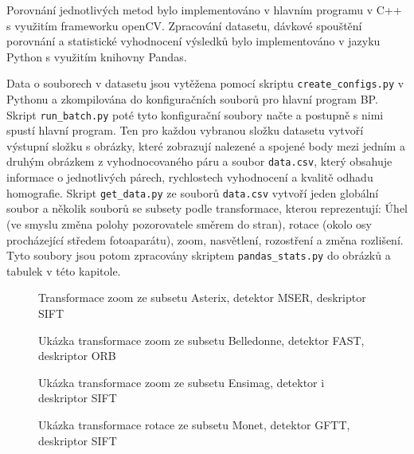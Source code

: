 
Porovnání jednotlivých metod bylo implementováno v hlavním programu v C++ s využitím frameworku
openCV. Zpracování datasetu, dávkové spouštění porovnání a statistické vyhodnocení výsledků bylo
implementováno v jazyku Python s využitím knihovny Pandas.


Data o souborech v datasetu jsou vytěžena pomocí skriptu \verb|create_configs.py| v Pythonu a zkompilována do konfiguračních souborů pro hlavní program BP. Skript \verb|run_batch.py| poté tyto konfigurační soubory načte a postupně s nimi spustí hlavní program. Ten pro každou vybranou složku datasetu vytvoří výstupní složku s obrázky, které zobrazují nalezené a spojené body mezi jedním a druhým obrázkem z vyhodnocovaného páru a soubor \verb|data.csv|, který obsahuje informace o jednotlivých párech, rychlostech vyhodnocení a kvalitě odhadu homografie. Skript \verb|get_data.py| ze souborů \verb|data.csv| vytvoří jeden globální soubor a několik souborů se subsety podle transformace, kterou reprezentují: Úhel (ve smyslu změna polohy pozorovatele směrem do stran), rotace (okolo osy procházející středem fotoaparátu), zoom, nasvětlení, rozostření a změna rozlišení. Tyto soubory jsou potom zpracovány skriptem \verb|pandas_stats.py| do obrázků a tabulek v této kapitole.


\begin{figure}[htp] 
	\caption{Transformace zoom ze subsetu Asterix, detektor MSER,
		deskriptor SIFT} \label{ex_asterix}
\end{figure}

\begin{figure}[htp] 
	\caption{Ukázka transformace zoom ze subsetu Belledonne, detektor FAST,
		deskriptor ORB}	\label{ex_belledonne}
\end{figure}

\begin{figure}[htp] 
	\caption{Ukázka transformace zoom ze subsetu Ensimag, detektor i 
		deskriptor SIFT} \label{ex_ensimag}
\end{figure}

\begin{figure}[htp] 
	\caption{Ukázka transformace rotace ze subsetu Monet, detektor GFTT, 
		deskriptor SIFT} \label{ex_MONET}
\end{figure}

